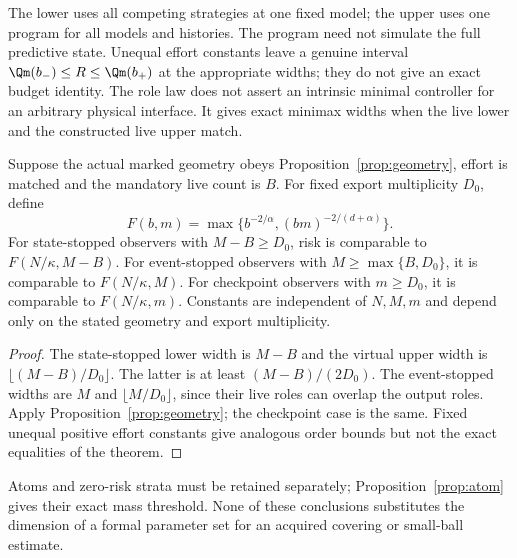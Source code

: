 The lower uses all competing strategies at one fixed model; the upper uses one program for all models and histories. The program need not simulate the full predictive state. Unequal effort constants leave a genuine interval $\Qm(b_-)\le R\le\Qm(b_+)$ at the appropriate widths; they do not give an exact budget identity. The role law does not assert an intrinsic minimal controller for an arbitrary physical interface. It gives exact minimax widths when the live lower and the constructed live upper match.

\begin{corollary}\label{cor:order}
Suppose the actual marked geometry obeys Proposition~\ref{prop:geometry}, effort is matched and the mandatory live count is $B$. For fixed export multiplicity $D_0$, define
\[
 F(b,m)=\max\{b^{-2/\alpha},(bm)^{-2/(d+\alpha)}\}.
\]
For state-stopped observers with $M-B\ge D_0$, risk is comparable to $F(N/\kappa,M-B)$. For event-stopped observers with $M\ge\max\{B,D_0\}$, it is comparable to $F(N/\kappa,M)$. For checkpoint observers with $m\ge D_0$, it is comparable to $F(N/\kappa,m)$. Constants are independent of $N,M,m$ and depend only on the stated geometry and export multiplicity.
\end{corollary}
\begin{proof}
The state-stopped lower width is $M-B$ and the virtual upper width is $\lfloor(M-B)/D_0\rfloor$. The latter is at least $(M-B)/(2D_0)$. The event-stopped widths are $M$ and $\lfloor M/D_0\rfloor$, since their live roles can overlap the output roles. Apply Proposition~\ref{prop:geometry}; the checkpoint case is the same. Fixed unequal positive effort constants give analogous order bounds but not the exact equalities of the theorem.
\end{proof}

Atoms and zero-risk strata must be retained separately; Proposition~\ref{prop:atom} gives their exact mass threshold. None of these conclusions substitutes the dimension of a formal parameter set for an acquired covering or small-ball estimate.
